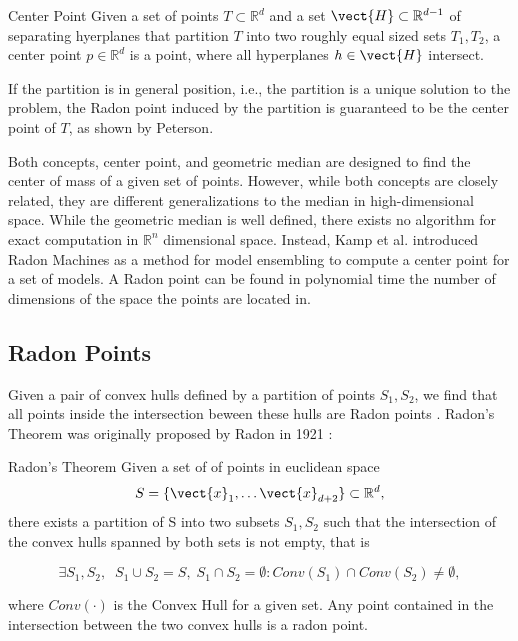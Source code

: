 \begin{definition}[parbox=false]{Center Point}
    Given a set of points $T \subset \mathbb{R}^{d}$ and a set  $\vect{H} \subset \mathbb{R}^{d-1}$ of separating hyerplanes that partition $T$  into two roughly equal sized sets $T_1, T_2$, a center point $p \in \mathbb{R}^d$ is a point, where all hyperplanes $h \in \vect{H}$ intersect.

    If the partition is in general position, i.e., the partition is a unique solution to the problem, the Radon point induced by the partition is guaranteed to be the center point of $T$, as shown by Peterson.~\cite{peterson1972geometry}
\end{definition}

Both concepts, center point, and geometric median are designed to find the center of mass of a given set of points.
However, while both concepts are closely related, they are different generalizations to the median in high-dimensional space.
While the geometric median is well defined, there exists no algorithm for exact computation in $\mathbb{R}^n$ dimensional space.
Instead, Kamp et al. \cite{kamp2017effective} introduced Radon Machines as a method for model ensembling to compute a center point for a set of models.
A Radon point can be found in polynomial time \wrt the number of dimensions of the space the points are located in.
\subsection{Radon Points}
Given a pair of convex hulls defined by a partition of points $S_1, S_2$, we find that all points inside the intersection beween these hulls are Radon points . 
Radon's Theorem was originally proposed by Radon in 1921 \cite{radon1921mengen}:

\begin{threm}[label=thm:radon]{Radon's Theorem}
    Given a set of of points in euclidean space
    \begin{equation}
        S = \{\vect{x}_1, \ldots \vect{x}_{d+2}\} \subset \mathbb{R}^d,
    \end{equation}
   there exists a partition of S into two subsets $S_1, S_2$ such that the intersection of the convex hulls spanned by both sets is not empty, that is
    
    \begin{equation}
        \exists S_1, S_2, \;\; S_1 \cup S_2 = S, \; S_1 \cap S_2 = \emptyset: Conv(S_1) \cap Conv(S_2) \neq \emptyset,
    \end{equation}

    where $Conv(\cdot)$ is the Convex Hull for a given set.
    Any point contained in the intersection between the two convex hulls is a radon point.
\end{threm}

